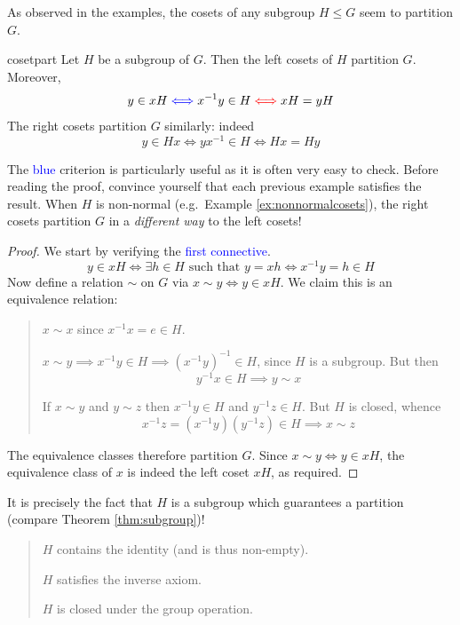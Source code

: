 \goodbreak

As observed in the examples, the cosets of any subgroup $H\le G$ seem to partition $G$.

\begin{thm}{}{cosetpart}
	Let $H$ be a subgroup of $G$. Then the left cosets of $H$ partition $G$. Moreover,
	\[y\in xH\textcolor{blue}{\iff} x^{-1}y\in H\textcolor{red}{\iff} xH=yH\]
	The right cosets partition $G$ similarly: indeed
	\[y\in Hx\iff yx^{-1}\in H\iff Hx=Hy\]
\end{thm}

The \textcolor{blue}{blue} criterion is particularly useful as it is often very easy to check. Before reading the proof, convince yourself that each previous example satisfies the result. When $H$ is non-normal  (e.g.\ Example \ref{ex:nonnormalcosets}), the right cosets partition $G$ in a \emph{different way} to the left cosets!

\begin{proof}
	We start by verifying the \textcolor{blue}{first connective}.
	\[y\in xH\iff \exists h\in H\text{ such that }y=xh\iff x^{-1}y=h\in H\]
	Now define a relation $\sim$ on $G$ via $x\sim y\iff y\in xH$. We claim this is an equivalence relation:
	\begin{quote}
	\begin{description}\itemsep2pt
		\item[\normalfont\emph{Reflexivity}:] $x\sim x$ since $x^{-1}x=e\in H$.
		\item[\normalfont\emph{Symmetry}:] $x\sim y\implies x^{-1}y\in H\implies (x^{-1}y)^{-1}\in H$, since $H$ is a subgroup. But then
		\[y^{-1}x\in H\implies y\sim x\]
		\item[\normalfont\emph{Transitivity}:] If $x\sim y$ and $y\sim z$ then $x^{-1}y\in H$ and $y^{-1}z\in H$. But $H$ is closed, whence
		\[x^{-1}z=(x^{-1}y)(y^{-1}z)\in H\implies x\sim z\]
	\end{description}
	\end{quote}
	The equivalence classes therefore partition $G$. Since $x\sim y\iff y\in xH$, the equivalence class of $x$ is indeed the left coset $xH$, as required.\qedhere
\end{proof}



It is precisely the fact that $H$ is a subgroup which guarantees a partition (compare Theorem \ref{thm:subgroup})!
\begin{quote}
\begin{description}\itemsep2pt
	\item[\normalfont\emph{Reflexivity}:]  $H$ contains the identity (and is thus non-empty).
	\item[\normalfont\emph{Symmetry}:] $H$ satisfies the inverse axiom.
	\item[\normalfont\emph{Transitivity}:] $H$ is closed under the group operation.
\end{description}
\end{quote}

